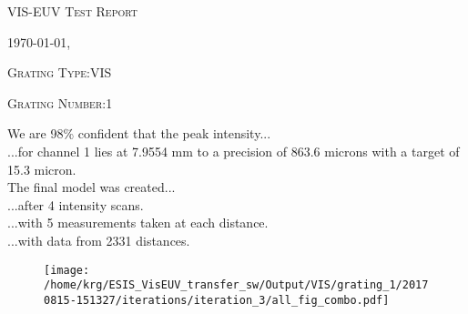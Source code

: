\documentclass[12pt,a4paper]{article}
\begin{document}
\begin{center}
{\scshape\LARGE VIS-EUV Test Report \par}
{\scshape\Large \today, \currenttime \par}
\bigskip
{\scshape\large Grating Type:VIS \par}
{\scshape\large Grating Number:1 \par}
\end{center}
\noindent We are 98\% confident that the peak intensity...\\
\indent...for channel 1 lies at 7.9554 mm to a precision of 863.6 microns with a target of 15.3 micron.\\
\noindent The final model was created...\\
\indent...after 4 intensity scans.\\
\indent...with 5 measurements taken at each distance.\\
\indent...with data from 2331 distances.\\
\begin{figure}[H]
\centering
\texttt{[image: /home/krg/ESIS\_VisEUV\_transfer\_sw/Output/VIS/grating\_1/20170815-151327/iterations/iteration\_3/all\_fig\_combo.pdf]}\\
\end{figure}
\end{document}
